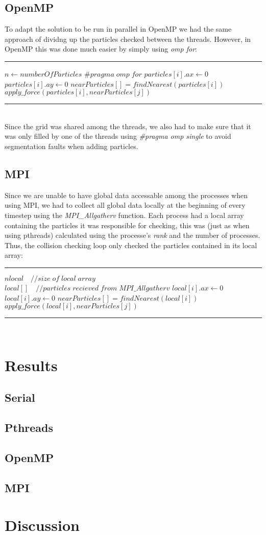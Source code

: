 \documentclass[11pt,a4paper]{article}
\begin{document}
\subsection{OpenMP}
To adapt the solution to be run in parallel in OpenMP we had the same approach of dividng up the particles checked between the threads. However, in OpenMP this was done much easier by simply using \emph{omp for}:
\\
\rule{125mm}{0.1pt}
\begin{algorithmic}
\STATE $n \gets numberOfParticles$
\STATE $\#pragma\;omp\;for$
	\STATE $particles[i].ax \gets 0$
	\STATE $particles[i].ay \gets 0$
	\STATE $nearParticles[] = findNearest(particles[i])$
			\STATE $apply\_force(particles[i],nearParticles[j])$
	\ENDFOR
\ENDFOR 
\end{algorithmic}
\rule{125mm}{0.1pt}
\vspace{10pt}
\\
Since the grid was shared among the threads, we also had to make sure that it was only filled by one of the threads using \emph{\#pragma omp single} to avoid segmentation faults when adding particles.
\subsection{MPI}
Since we are unable to have global data accessable among the processes when using MPI, we had to collect all global data locally at the beginning of every timestep using the \emph{MPI\_Allgatherv} function. Each process had a local array containing the particles it was responsible for checking, this was (just as when using pthreads) calculated using the processe's \emph{rank} and the number of processes. Thus, the collision checking loop only checked the particles contained in its local array:
\\
\rule{125mm}{0.1pt}
\begin{algorithmic}
\STATE $nlocal\quad //size\;of\;local\;array$
\STATE $local[]\quad //particles\;recieved\;from\;MPI\_Allgatherv$
	\STATE $local[i].ax \gets 0$
	\STATE $local[i].ay \gets 0$
	\STATE $nearParticles[] = findNearest(local[i])$
			\STATE $apply\_force(local[i],nearParticles[j])$
	\ENDFOR
\ENDFOR 
\end{algorithmic}
\rule{125mm}{0.1pt}
\vspace{10pt}
\\
\section{Results}
\subsection{Serial}
\subsection{Pthreads}
\subsection{OpenMP}
\subsection{MPI}
\section{Discussion}
\end{document}
